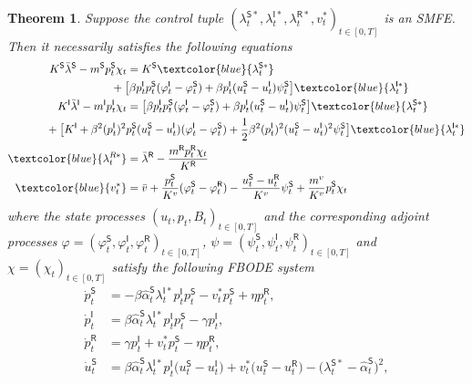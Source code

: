 \documentclass[letterpaper, 10 pt, conference]{ieeeconf}  %
\def\sS{\mathsf{S}}
\def\sI{\mathsf{I}}
\def\sR{\mathsf{R}}
\newtheorem{theorem}{Theorem}[section]
\begin{document}
\begin{theorem}
    {Suppose the control tuple
    $(\lambda_t^{\sS *},\lambda_t^{\sI *},
    \lambda_t^{\sR *},v_t^*)_{t\in[0,T]}$
    is an SMFE. Then it necessarily satisfies the following equations
    }
    \small
    \begin{equation}
        \label{eq:smfe_control}
        \begin{aligned}
K^\sS \bar{\lambda}^\sS-m^\sS p_t^\sS \chi_t &= K^\sS \textcolor{blue}{\lambda_t^{\sS *}} \\ & \hspace{-0.5cm}+\big[\beta p_t^\sI p_t^\sS(\varphi_t^\sI-\varphi_t^\sS)+\beta p_t^\sI(u_t^\sS-u_t^\sI) \psi_t^\sS\big]\textcolor{blue}{\lambda_t^{\sI *}}\\
K^\sI \bar{\lambda}^\sI-m^\sI p_t^\sI \chi_t & = \big[\beta p_t^\sI p_t^\sS(\varphi_t^\sI-\varphi_t^\sS)+\beta p_t^\sI(u_t^\sS-u_t^\sI) \psi_t^\sS\big]\textcolor{blue}{\lambda_t^{\sS *}} \\ & \hspace{-2.55cm} + \big[K^\sI + \beta^2 (p_t^\sI)^2 p_t^\sS (u_t^\sS-u_t^\sI)(\varphi_t^\sI-\varphi_t^\sS)+\frac{1}{2}\beta^2 (p_t^\sI)^2(u_t^\sS-u_t^\sI)^2 \psi_t^\sS\big]\textcolor{blue}{\lambda_t^{\sI *}} \\
\textcolor{blue}{\lambda_t^{R*}} &= \bar{\lambda}^\sR-\frac{m^\sR p_t^\sR\chi_t}{K^\sR} \\
\textcolor{blue}{v_t^*} &= \bar{v} + \frac{p_t^\sS}{K^v} (\varphi_t^\sS - \varphi_t^\sR) - \frac{u_t^\sS - u_t^\sR}{K^v}\psi_t^\sS + \frac{m^v}{K^v} p_t^\sS \chi_t
\end{aligned}
    \end{equation}
\normalsize
where the state processes $(u_t, p_t, B_t)_{t \in [0,T]}$ and the corresponding adjoint processes $\varphi = (\varphi_t^\sS,\varphi_t^\sI,\varphi_t^\sR)_{t \in [0,T]}$, $\psi = (\psi_t^\sS,\psi_t^\sI,\psi_t^\sR)_{t \in [0,T]}$ and $\chi = (\chi_t)_{t \in [0,T]}$ satisfy the following FBODE system
\small
\allowdisplaybreaks
\begin{align}
        \dot p_t^\sS&=-\beta\hat{\alpha}_t^\sS\lambda_t^{\sI*}p_t^\sI p_t^\sS-v^*_t p_t^\sS+\eta p_t^\sR,\nonumber\\
\dot p_t^\sI&=\beta\hat{\alpha}_t^\sS \lambda_t^{\sI*}p_t^\sI p_t^\sS-\gamma p_t^\sI,\nonumber\\
\dot p_t^\sR&=\gamma p_t^\sI+v_t^*p_t^\sS-\eta p_t^\sR,\nonumber \\
\dot u_t^\sS&=\beta\hat{\alpha}_t^\sS \lambda_t^{\sI*}p_t^\sI\big(u_t^\sS-u_t^\sI\big)+v^*_t\big(u_t^\sS-u_t^\sR\big) - \big(\lambda_t^{\sS*}-\hat{\alpha}_t^\sS\big)^2,\nonumber\\

\end{align}
\end{theorem}
\end{document}
